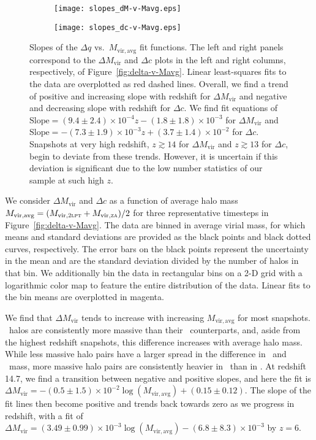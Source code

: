 \begin{figure*}[tp]
	\centering
	\begin{subfigure}{}
		\texttt{[image: slopes\_dM-v-Mavg.eps]}
	\end{subfigure}
	\begin{subfigure}{}
		\texttt{[image: slopes\_dc-v-Mavg.eps]}
	\end{subfigure}
	\caption[Slopes of the $\Delta q$ vs.\ $M_{\mathrm{vir,avg}}$ fit functions.]{\footnotesize Slopes of the $\Delta q$ vs.\ $M_{\mathrm{vir,avg}}$ fit functions.  The left and right panels correspond to the $\Delta M_{\mathrm{vir}}$ and $\Delta c$ plots in the left and right columns, respectively, of Figure~\ref{fig:delta-v-Mavg}.  Linear least-squares fits to the data are overplotted as red dashed lines.  Overall, we find a trend of positive and increasing slope with redshift for $\Delta M_{\mathrm{vir}}$ and negative and decreasing slope with redshift for $\Delta c$.  We find fit equations of $\mathrm{Slope} = (9.4 \pm 2.4) \times 10^{-4} z - (1.8 \pm 1.8) \times 10^{-3}$ for $\Delta M_{\mathrm{vir}}$ and $\mathrm{Slope} = -(7.3 \pm 1.9) \times 10^{-3} z + (3.7 \pm 1.4) \times 10^{-2}$ for $\Delta c$.  Snapshots at very high redshift, $z \gtrsim 14$ for $\Delta M_{\mathrm{vir}}$ and $z \gtrsim 13$ for $\Delta c$, begin to deviate from these trends.  However, it is uncertain if this deviation is significant due to the low number statistics of our sample at such high $z$.}
	\label{fig:slopes_delta-v-Mavg}
\end{figure*}

We consider $\Delta M_{\mathrm{vir}}$ and $\Delta c$ as a function of average halo mass $M_{\mathrm{vir,avg}} = (M_{\mathrm{vir},\textsc{2lpt}} + M_{\mathrm{vir},\textsc{za}}) / 2$ for three representative timesteps in Figure~\ref{fig:delta-v-Mavg}.  The data are binned in average virial mass, for which means and standard deviations are provided as the black points and black dotted curves, respectively.  The error bars on the black points represent the uncertainty in the mean and are the standard deviation divided by the number of halos in that bin.  We additionally bin the data in rectangular bins on a 2-D grid with a logarithmic color map to feature the entire distribution of the data.  Linear fits to the bin means are overplotted in magenta.

We find that $\Delta M_{\mathrm{vir}}$ tends to increase with increasing $M_{\mathrm{vir,avg}}$ for most snapshots.  \lpt\ halos are consistently more massive than their \za\ counterparts, and, aside from the highest redshift snapshots, this difference increases with average halo mass.  While less massive halo pairs have a larger spread in the difference in \lpt\ and \za\ mass, more massive halo pairs are consistently heavier in \lpt\ than in \za.  At redshift 14.7, we find a transition between negative and positive slopes, and here the fit is $\Delta M_{\mathrm{vir}} = -(0.5 \pm 1.5) \times 10^{-2} \log(M_{\mathrm{vir,avg}}) + (0.15 \pm 0.12)$.   The slope of the fit lines then become positive and trends back towards zero as we progress in redshift, with a fit of $\Delta M_{\mathrm{vir}} = (3.49 \pm 0.99) \times 10^{-3} \log(M_{\mathrm{vir,avg}}) - (6.8 \pm 8.3) \times 10^{-3}$ by $z = 6$.

